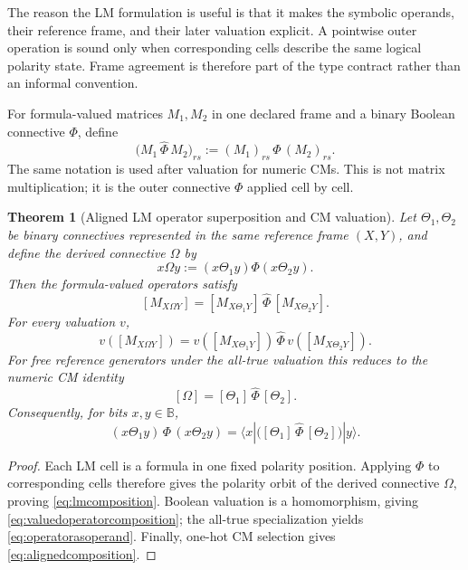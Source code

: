 \documentclass[11pt]{article}
\newtheorem{theorem}{Theorem}[section]
\theoremstyle{definition}
\theoremstyle{remark}
\newcommand{\B}{\mathbb B}
\begin{document}
The reason the LM formulation is useful is that it makes the symbolic operands, their reference frame, and their later valuation explicit.  A pointwise outer operation is sound only when corresponding cells describe the same logical polarity state.  Frame agreement is therefore part of the type contract rather than an informal convention.

For formula-valued matrices $M_1,M_2$ in one declared frame and a binary Boolean connective $\Phi$, define
\begin{equation}
 \bigl(M_1\,\widehat\Phi\,M_2\bigr)_{rs}
 :=(M_1)_{rs}\,\Phi\,(M_2)_{rs}.
 \label{eq:binarypointwise}
\end{equation}
The same notation is used after valuation for numeric CMs.  This is not matrix multiplication; it is the outer connective $\Phi$ applied cell by cell.

\begin{theorem}[Aligned LM operator superposition and CM valuation]
\label{thm:lmsuperposition}
Let $\Theta_1,\Theta_2$ be binary connectives represented in the same reference frame $(X,Y)$, and define the derived connective $\Omega$ by
\begin{equation}
 x\Omega y:=(x\Theta_1y)\Phi(x\Theta_2y).
 \label{eq:omegadef}
\end{equation}
Then the formula-valued operators satisfy
\begin{equation}
 \boxed{
 [M_{X\Omega Y}]
 =[M_{X\Theta_1Y}]\,\widehat\Phi\,[M_{X\Theta_2Y}].}
 \label{eq:lmcomposition}
\end{equation}
For every valuation $v$,
\begin{equation}
 v([M_{X\Omega Y}])
 =v([M_{X\Theta_1Y}])\,\widehat\Phi\,v([M_{X\Theta_2Y}]).
 \label{eq:valuedoperatorcomposition}
\end{equation}
For free reference generators under the all-true valuation this reduces to the numeric CM identity
\begin{equation}
 \boxed{[\Omega]=[\Theta_1] \,\widehat\Phi\, [\Theta_2].}
 \label{eq:operatorasoperand}
\end{equation}
Consequently, for bits $x,y\in\B$,
\begin{equation}
 \boxed{
 (x\Theta_1y)\,\Phi\,(x\Theta_2y)
 =\langle x|\bigl([\Theta_1] \,\widehat\Phi\, [\Theta_2]\bigr)|y\rangle.}
 \label{eq:alignedcomposition}
\end{equation}
\end{theorem}
\begin{proof}
Each LM cell is a formula in one fixed polarity position.  Applying $\Phi$ to corresponding cells therefore gives the polarity orbit of the derived connective $\Omega$, proving \eqref{eq:lmcomposition}.  Boolean valuation is a homomorphism, giving \eqref{eq:valuedoperatorcomposition}; the all-true specialization yields \eqref{eq:operatorasoperand}.  Finally, one-hot CM selection gives \eqref{eq:alignedcomposition}.
\end{proof}
\end{document}
